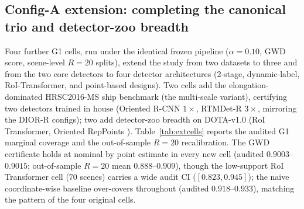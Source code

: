\documentclass[11pt]{article}
\begin{document}
\subsection{Config-A extension: completing the canonical trio and detector-zoo breadth}\label{sec:configA}
Four further G1 cells, run under the identical frozen pipeline ($\alpha=0.10$, GWD score, scene-level $R{=}20$
splits), extend the study from two datasets to three and from the two core detectors to four detector architectures
(2-stage, dynamic-label, RoI-Transformer, and point-based designs). Two cells add the elongation-dominated
HRSC2016-MS ship benchmark \citep{liu2017hrsc2016} (the multi-scale variant), certifying two detectors trained in house (Oriented
R-CNN $1\times$, RTMDet-R $3\times$, mirroring the DIOR-R configs); two add detector-zoo breadth on
DOTA-v1.0 (RoI Transformer, Oriented RepPoints \citep{li2022reppoints}). Table~\ref{tab:extcells} reports the audited G1 marginal
coverage and the out-of-sample $R{=}20$ recalibration. The GWD certificate holds at nominal by point estimate
in every new cell (audited $0.9003$--$0.9015$; out-of-sample $R{=}20$ mean $0.888$--$0.909$), though the
low-support RoI Transformer cell ($70$ scenes) carries a wide audit CI ($[0.823,0.945]$); the naive
coordinate-wise baseline over-covers throughout (audited $0.918$--$0.933$), matching the pattern of the
four original cells.
\end{document}
